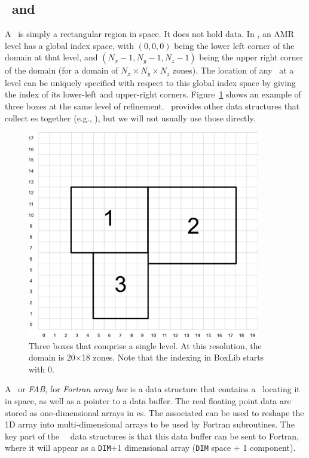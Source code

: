\subsection{\bbox\ and \farraybox}

A \bbox\ is simply a rectangular region in space.  It does not hold
data.  In \boxlib, an AMR level has a global index space, with
$(0,0,0)$ being the lower left corner of the domain at that level, and
$(N_x-1, N_y-1, N_z-1)$ being the upper right corner of the domain
(for a domain of $N_x \times N_y \times N_z$ zones).  The location of
any \bbox\ at a level can be uniquely specified with respect to this
global index space by giving the index of its lower-left and
upper-right corners.  Figure~\ref{fig:soft:indexspace} shows an
example of three boxes at the same level of refinement.
\boxlib\ provides other data structures that collect \bbox es together
(e.g., \boxarray), but we will not usually use those directly.

\begin{figure}[t]
\centering
\includegraphics[width=4.0in]{index_grid2}
\caption[Single-level grid structure]
{\label{fig:soft:indexspace} Three boxes that comprise a single level.  At this
  resolution, the domain is 20$\times$18 zones.  Note that the
  indexing in BoxLib starts with $0$.}
\end{figure}


A \farraybox\ or {\em FAB}, for {\em Fortran array box} is a data
structure that contains a \bbox\ locating it in space, as well as a
pointer to a data buffer.  The real floating point data are stored as
one-dimensional arrays in \farraybox es.  The associated \bbox can be
used to reshape the 1D array into multi-dimensional arrays to be used
by Fortran subroutines.  The key part of the \cpp\ \boxlib\ data
structures is that this data buffer can be sent to Fortran, where it
will appear as a {\tt DIM}+1 dimensional array ({\tt DIM} space + 1
component).

